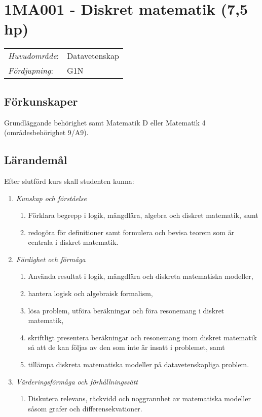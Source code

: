 \section*{1MA001 - Diskret matematik (7,5 hp)}

\begin{tabular}{ll}\emph{Huvudområde}: & Datavetenskap\tabularnewline\emph{Fördjupning}: & G1N\tabularnewline\end{tabular}

\subsection*{Förkunskaper}

Grundläggande behörighet samt Matematik D eller Matematik 4
(områdesbehörighet 9/A9).

\subsection*{Lärandemål}

Efter slutförd kurs skall studenten kunna:

\begin{enumerate}
\def\labelenumi{\Alph{enumi}.}
\tightlist
\item
  \emph{Kunskap och förståelse}

  \begin{enumerate}
  \def\labelenumii{\Alph{enumi}.\arabic{enumii}.}
  \tightlist
  \item
    Förklara begrepp i logik, mängdlära, algebra och diskret matematik,
    samt
  \item
    redogöra för definitioner samt formulera och bevisa teorem som är
    centrala i diskret matematik.
  \end{enumerate}
\item
  \emph{Färdighet och förmåga}

  \begin{enumerate}
  \def\labelenumii{\Alph{enumi}.\arabic{enumii}.}
  \tightlist
  \item
    Använda resultat i logik, mängdlära och diskreta matematiska
    modeller,
  \item
    hantera logisk och algebraisk formalism,
  \item
    lösa problem, utföra beräkningar och föra resonemang i diskret
    matematik,
  \item
    skriftligt presentera beräkningar och resonemang inom diskret
    matematik så att de kan följas av den som inte är insatt i
    problemet, samt
  \item
    tillämpa diskreta matematiska modeller på datavetenskapliga problem.
  \end{enumerate}
\item
  \emph{Värderingsförmåga och förhållningssätt}

  \begin{enumerate}
  \def\labelenumii{\Alph{enumi}.\arabic{enumii}.}
  \tightlist
  \item
    Diskutera relevans, räckvidd och noggrannhet av matematiska modeller
    såsom grafer och differensekvationer.
  \end{enumerate}
\end{enumerate}


